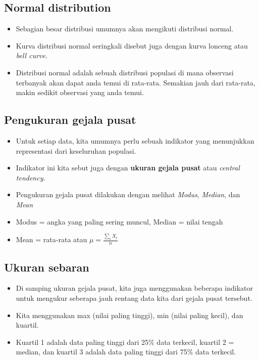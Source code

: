 \documentclass[
  letterpaper,
  DIV=11,
  numbers=noendperiod]{scrartcl}
\begin{document}
\hypertarget{normal-distribution-1}{%
\subsection{Normal distribution}\label{normal-distribution-1}}

\begin{itemize}
\item
  Sebagian besar distribusi umumnya akan mengikuti distribusi normal.
\item
  Kurva distribusi normal seringkali disebut juga dengan kurva lonceng
  atau \emph{bell curve}.
\item
  Distribusi normal adalah sebuah distribusi populasi di mana observasi
  terbanyak akan dapat anda temui di rata-rata. Semakian jauh dari
  rata-rata, makin sedikit observasi yang anda temui.
\end{itemize}

\hypertarget{pengukuran-gejala-pusat}{%
\subsection{Pengukuran gejala pusat}\label{pengukuran-gejala-pusat}}

\begin{itemize}
\item
  Untuk setiap data, kita umumnya perlu sebuah indikator yang
  menunjukkan representasi dari keseluruhan populasi.
\item
  Indikator ini kita sebut juga dengan \textbf{ukuran gejala pusat} atau
  \emph{central tendency}.
\item
  Pengukuran gejala pusat dilakukan dengan melihat \emph{Modus},
  \emph{Median}, dan \emph{Mean}
\item
  Modus = angka yang paling sering muncul, Median = nilai tengah
\item
  Mean = rata-rata atau \(\mu=\frac{\sum_iX_i}{n}\)
\end{itemize}

\hypertarget{ukuran-sebaran}{%
\subsection{Ukuran sebaran}\label{ukuran-sebaran}}

\begin{itemize}
\item
  Di samping ukuran gejala pusat, kita juga menggunakan beberapa
  indikator untuk mengukur seberapa jauh rentang data kita dari gejala
  pusat tersebut.
\item
  Kita menggunakan max (nilai paling tinggi), min (nilai paling kecil),
  dan kuartil.
\item
  Kuartil 1 adalah data paling tinggi dari 25\% data terkecil, kuartil 2
  = median, dan kuartil 3 adalah data paling tinggi dari 75\% data
  terkecil.
\end{itemize}
\end{document}
